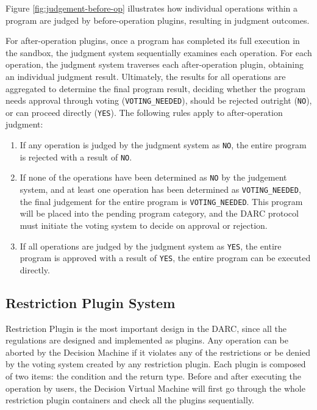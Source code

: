 \documentclass[main.tex]{subfiles}
\begin{document}
Figure \ref{fig:judgement-before-op} illustrates how individual operations within a program are judged by before-operation plugins, resulting in judgment outcomes.







For after-operation plugins, once a program has completed its full execution in the sandbox, the judgment system sequentially examines each operation. For each operation, the judgment system traverses each after-operation plugin, obtaining an individual judgment result. Ultimately, the results for all operations are aggregated to determine the final program result, deciding whether the program needs approval through voting (\texttt{VOTING\_NEEDED}), should be rejected outright (\texttt{NO}), or can proceed directly (\texttt{YES}). The following rules apply to after-operation judgment:

\begin{enumerate}
    \item If any operation is judged by the judgment system as \texttt{NO}, the entire program is rejected with a result of \texttt{NO}.
    \item If none of the operations have been determined as \texttt{NO} by the judgement system, and at least one operation has been determined as \texttt{VOTING\_NEEDED}, the final judgement for the entire program is \texttt{VOTING\_NEEDED}. This program will be placed into the pending program category, and the DARC protocol must initiate the voting system to decide on approval or rejection.
    \item If all operations are judged by the judgment system as \texttt{YES}, the entire program is approved with a result of \texttt{YES}, the entire program can be executed directly.
\end{enumerate}




\subsection{Restriction Plugin System}

Restriction Plugin is the most important design in the DARC, since all the regulations are designed and implemented as plugins. Any operation can be aborted by the Decision Machine if it violates any of the restrictions or be denied by the voting system created by any restriction plugin. Each plugin is composed of two items: the condition and the return type. Before and after executing the operation by users, the Decision Virtual Machine will first go through the whole restriction plugin containers and check all the plugins sequentially. 
\end{document}

